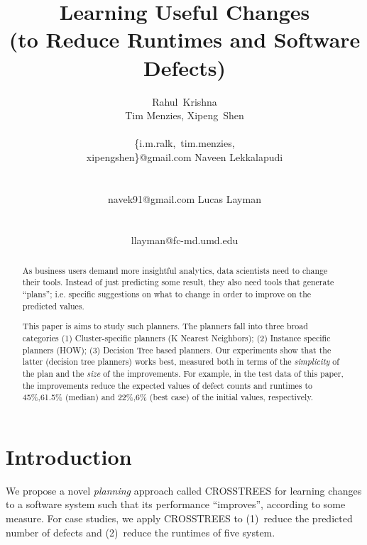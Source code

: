 \documentclass{sig-alternate}
\begin{document}
  

\title{Learning Useful Changes\\(to Reduce Runtimes and Software Defects)}
\author{
\alignauthor 
Rahul~Krishna\\Tim Menzies, Xipeng~Shen \\
       \\
       {\{i.m.ralk,~tim.menzies,\\xipengshen\}@gmail.com}
\alignauthor
Naveen   Lekkalapudi\\
  \\ 
       \\ 
       {navek91@gmail.com}
\alignauthor
Lucas Layman \\
        \\ 
       \\ 
       {llayman@fc-md.umd.edu}
\setlength{\columnsep}{7mm}
}
\maketitle
\begin{abstract}
 As business users demand more insightful
 analytics, data scientists need to change
 their tools. Instead of just predicting 
 some result, they also need tools that generate ``plans'';
 i.e. specific suggestions on  what to change  in order to
 improve on the predicted values.
 
This paper is aims to study such planners. The planners fall into three broad categories (1) Cluster-specific planners (K Nearest Neighbors); (2) Instance specific planners (HOW); (3) Decision Tree based planners. 
Our experiments show that the latter (decision tree planners)
works best, measured both in terms of the {\em simplicity} of the plan
and the {\em size} of the improvements.
For example, in the   test data of this paper, the  improvements   reduce
 the expected values of defect counts and  runtimes to    
 45\%,61.5\%  (median) and 22\%,6\% (best case) of the initial values, respectively.
\end{abstract}
\section{Introduction}
We propose a novel {\em planning} approach called CROSSTREES for learning changes to a software system
such that its performance ``improves'', according to some measure. For  case 
studies, we apply CROSSTREES to   (1)~reduce the predicted number
of defects and (2)~reduce the runtimes of five system. 
\end{document}

